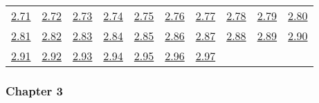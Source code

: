 \begin{tabular}{llllllllll}
\\ 
\hyperref[Exercise 2.71]{2.71} &
\hyperref[Exercise 2.72]{2.72} &
\hyperref[Exercise 2.73]{2.73} &
\hyperref[Exercise 2.74]{2.74} &
\hyperref[Exercise 2.75]{2.75} &
\hyperref[Exercise 2.76]{2.76} &
\hyperref[Exercise 2.77]{2.77} &
\hyperref[Exercise 2.78]{2.78} &
\hyperref[Exercise 2.79]{2.79} &
\hyperref[Exercise 2.80]{2.80}
\\ 
\hyperref[Exercise 2.81]{2.81} &
\hyperref[Exercise 2.82]{2.82} &
\hyperref[Exercise 2.83]{2.83} &
\hyperref[Exercise 2.84]{2.84} &
\hyperref[Exercise 2.85]{2.85} &
\hyperref[Exercise 2.86]{2.86} &
\hyperref[Exercise 2.87]{2.87} &
\hyperref[Exercise 2.88]{2.88} &
\hyperref[Exercise 2.89]{2.89} &
\hyperref[Exercise 2.90]{2.90}
\\ 
\hyperref[Exercise 2.91]{2.91} &
\hyperref[Exercise 2.92]{2.92} &
\hyperref[Exercise 2.93]{2.93} &
\hyperref[Exercise 2.94]{2.94} &
\hyperref[Exercise 2.95]{2.95} &
\hyperref[Exercise 2.96]{2.96} &
\hyperref[Exercise 2.97]{2.97} &
\end{tabular} 

\subsubsection*{Chapter 3} 


